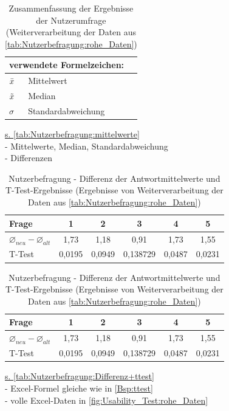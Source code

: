 \begin{table}[H]
\begin{tabular}{ll}
\multicolumn{2}{l}{verwendete Formelzeichen:} \\ \hline
$\Bar{x}$          & Mittelwert               \\
$\Tilde{x}$        & Median                   \\
$\sigma$           & Standardabweichung      
\end{tabular}
\caption{Zusammenfassung der Ergebnisse der Nutzerumfrage (Weiterverarbeitung der Daten aus \autoref{tab:Nutzerbefragung:rohe_Daten})}
\label{tab:Nutzerbefragung:mittelwerte}
\end{table}

\noindent
\underline{s. \autoref{tab:Nutzerbefragung:mittelwerte}}\\
- Mittelwerte, Median, Standardabweichung\\
- Differenzen

\begin{table}[H]
\begin{center}
\begin{tabular}{|l|c|c|c|c|c|}
\hline
Frage                                   & 1      & 2      & 3        & 4      & 5      \\ \hline
$\varnothing_{neu} - \varnothing_{alt}$ & 1,73   & 1,18   & 0,91     & 1,73   & 1,55   \\ \hline
T-Test                                  & 0,0195 & 0,0949 & 0,138729 & 0,0487 & 0,0231 \\ \hline
\end{tabular}
\begin{tabular}{|l|c|c|c|c|c|}
\hline
Frage                                   & 1      & 2      & 3        & 4      & 5      \\ \hline
$\varnothing_{neu} - \varnothing_{alt}$ & 1,73   & 1,18   & 0,91     & 1,73   & 1,55   \\ \hline
T-Test                                  & 0,0195 & 0,0949 & 0,138729 & 0,0487 & 0,0231 \\ \hline
\end{tabular}
\caption{Nutzerbefragung - Differenz der Antwortmittelwerte und T-Test-Ergebnisse (Ergebnisse von Weiterverarbeitung der Daten aus \autoref{tab:Nutzerbefragung:rohe_Daten})}
\label{tab:Nutzerbefragung:Differenz+ttest}
\end{center}
\end{table}

\noindent
\underline{s. \autoref{tab:Nutzerbefragung:Differenz+ttest}}\\
- Excel-Formel gleiche wie in \autoref{Bsp:ttest}\\
- volle Excel-Daten in \autoref{fig:Usability_Test:rohe_Daten}
